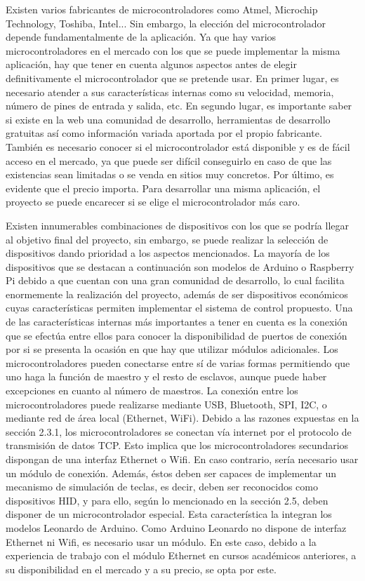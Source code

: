 Existen varios fabricantes de microcontroladores como Atmel, Microchip Technology, Toshiba, Intel... Sin embargo, la elección del microcontrolador depende fundamentalmente de la aplicación. Ya que hay varios microcontroladores en el mercado con los que se puede implementar la misma aplicación, hay que tener en cuenta algunos aspectos antes de elegir definitivamente el microcontrolador que se pretende usar. En primer lugar, es necesario atender a sus características internas como su velocidad, memoria, número de pines de entrada y salida, etc. En segundo lugar, es importante saber si existe en la web una comunidad de desarrollo, herramientas de desarrollo gratuitas así como información variada aportada por el propio fabricante. También es necesario conocer si el microcontrolador está disponible y es de fácil acceso en el mercado, ya que puede ser difícil conseguirlo en caso de que las existencias sean limitadas o se venda en sitios muy concretos. Por último, es evidente que el precio importa. Para desarrollar una misma aplicación, el proyecto se puede encarecer si se elige el microcontrolador más caro.

Existen innumerables combinaciones de dispositivos con los que se podría llegar al objetivo final del proyecto, sin embargo, se puede realizar la selección de dispositivos dando prioridad a los aspectos mencionados. La mayoría de los dispositivos que se destacan a continuación son modelos de Arduino o Raspberry Pi debido a que cuentan con una gran comunidad de desarrollo, lo cual facilita enormemente la realización del proyecto, además de ser dispositivos económicos cuyas características permiten implementar el sistema de control propuesto. Una de las características internas más importantes a tener en cuenta es la conexión que se efectúa entre ellos para conocer la disponibilidad de puertos de conexión por si se presenta la ocasión en que hay que utilizar módulos adicionales. Los microcontroladores pueden conectarse entre sí de varias formas permitiendo que uno haga la función de maestro y el resto de esclavos, aunque puede haber excepciones en cuanto al número de maestros. La conexión entre los microcontroladores puede realizarse mediante USB, Bluetooth, SPI, I2C, o mediante red de área local (Ethernet, WiFi). Debido a las razones expuestas en la sección 2.3.1, los microcontroladores se conectan vía internet por el protocolo de transmisión de datos TCP. Esto implica que los microcontroladores secundarios dispongan de una interfaz Ethernet o Wifi. En caso contrario, sería necesario usar un módulo de conexión. Además, éstos deben ser capaces de implementar un mecanismo de simulación de teclas, es decir, deben ser reconocidos como dispositivos HID, y para ello, según lo mencionado en la sección 2.5, deben disponer de un microcontrolador especial. Esta característica la integran los modelos Leonardo de Arduino. Como Arduino Leonardo no dispone de interfaz Ethernet ni Wifi, es necesario usar un módulo. En este caso, debido a la experiencia de trabajo con el módulo Ethernet en cursos académicos anteriores, a su disponibilidad en el mercado y a su precio, se opta por este.

